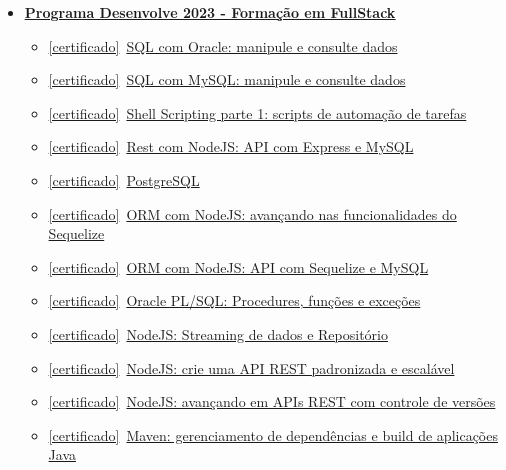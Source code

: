 \documentclass[letterpaper,11pt]{article}
\newcommand{\cert}[2]{\href{#1}{\scriptsize [certificado]}\ \href{#1}{#2}}
\begin{document}
\begin{itemize}[leftmargin=0.15in, label={}]
    \item \small \textbf{\href{https://raw.githubusercontent.com/elvitin/curriculo/main/certs/desenvolve/CertificadoDesenvolve2023.pdf}{\underline{Programa Desenvolve 2023 - Formação em FullStack}}}
\begin{itemize}[itemsep=-5pt, parsep=3pt]
    \item\small \cert{https://cursos.alura.com.br/user/v-rodrigues/course/oracle-database-sql-dml/formalCertificate}{SQL com Oracle: manipule e consulte dados}
    \item\small \cert{https://cursos.alura.com.br/user/v-rodrigues/course/mysql-manipule-dados-com-sql/formalCertificate}{SQL com MySQL: manipule e consulte dados}
    \item\small \cert{https://cursos.alura.com.br/user/v-rodrigues/course/shellscripting/formalCertificate}{Shell Scripting parte 1: scripts de automação de tarefas}
    \item\small \cert{https://cursos.alura.com.br/user/v-rodrigues/course/node-rest-api/formalCertificate}{Rest com NodeJS: API com Express e MySQL}
    \item\small \cert{https://cursos.alura.com.br/user/v-rodrigues/course/introducao-postgresql-primeiros-passos/formalCertificate}{PostgreSQL}
    \item\small \cert{https://cursos.alura.com.br/user/v-rodrigues/course/orm-nodejs-avancando-sequelize/formalCertificate}{ORM com NodeJS: avançando nas funcionalidades do Sequelize}
    \item\small \cert{https://cursos.alura.com.br/user/v-rodrigues/course/orm-nodejs-api-sequelize-mysql/formalCertificate}{ORM com NodeJS: API com Sequelize e MySQL}
    \item\small \cert{https://cursos.alura.com.br/user/v-rodrigues/course/oracle-plsql-procedures-funcoes-excecoes/formalCertificate}{Oracle PL/SQL: Procedures, funções e exceções}
    \item\small \cert{https://cursos.alura.com.br/user/v-rodrigues/course/nodejs-streaming-dados/formalCertificate}{NodeJS: Streaming de dados e Repositório}
    \item\small \cert{https://cursos.alura.com.br/user/v-rodrigues/course/nodejs-api-rest-padronizada-escalavel/formalCertificate}{NodeJS: crie uma API REST padronizada e escalável}
    \item\small \cert{https://cursos.alura.com.br/user/v-rodrigues/course/nodejs-api-rest-controle-versao/formalCertificate}{NodeJS: avançando em APIs REST com controle de versões}
    \item\small \cert{https://cursos.alura.com.br/user/v-rodrigues/course/maven-gerenciamento-dependencias-build-aplicacoes-java/formalCertificate}{Maven: gerenciamento de dependências e build de aplicações Java}

\end{itemize}
\end{itemize}
\end{document}
